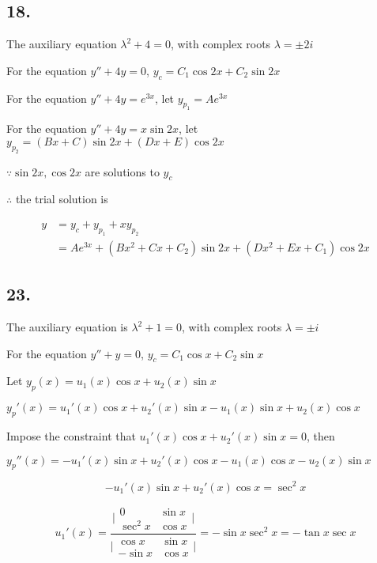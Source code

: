 \documentclass{article}
\begin{document}
  \subsection*{18. }

  The auxiliary equation $\lambda^2 + 4 = 0$, with complex roots $\lambda = \pm 2i$

  For the equation $y'' + 4y = 0$, $y_c = C_1 \cos 2x + C_2 \sin 2x$
  
  For the equation $y'' + 4y = e^{3x}$, let $y_{p_1} = Ae^{3x}$

  For the equation $y'' + 4y = x \sin 2x$, let $y_{p_2} = (Bx + C) \sin 2x + (Dx + E) \cos 2x$

  $\because \sin 2x, \cos 2x$ are solutions to $y_c$ 

  $\therefore$ the trial solution is

  $$\begin{aligned}
    y &= y_c + y_{p_1} + xy_{p_2} \\
      &= Ae^{3x} + (Bx^2 + Cx + C_2) \sin 2x + (Dx^2 + Ex + C_1) \cos 2x
  \end{aligned}
  $$

  \subsection*{23. }

  The auxiliary equation is $\lambda^2 + 1 = 0$, with complex roots $\lambda = \pm i$

  For the equation $y'' + y = 0$, $y_c = C_1 \cos x + C_2 \sin x$

  Let $y_p(x) = u_1(x) \cos x + u_2(x) \sin x$

  $y_p'(x) = u_1'(x) \cos x + u_2'(x) \sin x - u_1(x) \sin x + u_2(x) \cos x$

  Impose the constraint that $u_1'(x) \cos x + u_2'(x) \sin x = 0$, then

  $y_p''(x) = -u_1'(x) \sin x + u_2'(x) \cos x - u_1(x) \cos x - u_2(x) \sin x$

  $$-u_1'(x) \sin x + u_2'(x) \cos x = \sec^2 x$$

  $$u_1'(x) = \frac{\biggl| \begin{matrix}
      0 & \sin x \\
      \sec^2 x & \cos x
  \end{matrix} \biggl|
  }{\biggl| \begin{matrix}
    \cos x & \sin x \\
    -\sin x & \cos x
\end{matrix} \biggl|} = -\sin x \sec^2 x = -\tan x \sec x$$
\end{document}
